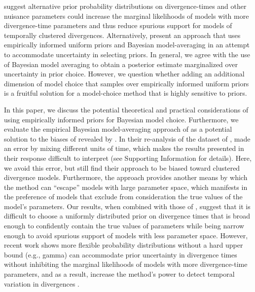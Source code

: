 \citet{Oaks2012} suggest alternative prior probability distributions on
divergence-times and other nuisance parameters could increase the marginal
likelihoods of models with more divergence-time parameters and thus reduce
spurious support for models of temporally clustered divergences.
Alternatively, \citet{Hickerson2013} present an approach that uses empirically
informed uniform priors and Bayesian model-averaging in an attempt to accommodate
uncertainty in selecting priors.
In general, we agree with the use of Bayesian model averaging to obtain a
posterior estimate marginalized over uncertainty in prior choice.
However, we question whether adding an additional dimension of model choice
that samples over empirically informed uniform priors is a fruitful solution
for a model-choice method that is highly sensitive to priors.

In this paper, we discuss the potential theoretical and practical
considerations of using empirically informed priors for Bayesian model choice.
Furthermore, we evaluate the empirical Bayesian model-averaging approach of
\citet{Hickerson2013} as a potential solution to the biases of \msb revealed by
\citet{Oaks2012}.
In their re-analysis of the dataset of \citet{Oaks2012}, \citet{Hickerson2013}
made an error by mixing different units of time, which makes the results
presented in their response difficult to interpret (see Supporting Information
for details).
Here, we avoid this error, but still find their approach to be biased toward
clustered divergence models.
Furthermore, the approach provides another means by which the method can
``escape'' models with large parameter space, which manifests in the preference
of models that exclude from consideration the true values of the model's
parameters.
Our results, when combined with those of \citet{Oaks2012}, suggest that it is
difficult to choose a uniformly distributed prior on divergence times that is
broad enough to confidently contain the true values of parameters while being
narrow enough to avoid spurious support of models with less parameter space.
However, recent work shows more flexible probability distributions without a
hard upper bound (e.g., gamma) can accommodate prior uncertainty in divergence
times without inhibiting the marginal likelihoods of models with more
divergence-time parameters, and as a result, increase the method's power to
detect temporal variation in divergences
\citet{Oaks2014dpp}.


